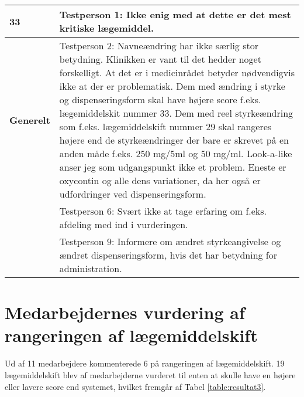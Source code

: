 \begin{longtable} {|p{2.2cm}|p{12cm}|}
\cellcolor[HTML]{C0C0C0}\textbf{33} & Testperson 1: Ikke enig med at dette er det mest kritiske lægemiddel. \\ \hline
\cellcolor[HTML]{C0C0C0}\textbf{Generelt}\multirow{3}{*} & Testperson 2: Navneændring har ikke særlig stor betydning. Klinikken er vant til det hedder noget forskelligt. At det er i medicinrådet betyder nødvendigvis ikke at der er problematisk. Dem med ændring i styrke og dispenseringsform skal have højere score f.eks. lægemiddelskit nummer 33.  Dem med reel styrkeændring som f.eks. lægemiddelskift nummer 29 skal rangeres højere end de styrkeændringer der bare er skrevet på en anden måde f.eks. 250 mg/5ml og 50 mg/ml. Look-a-like anser jeg som udgangspunkt ikke et problem. Eneste er oxycontin og alle dens variationer, da her også er udfordringer ved dispenseringsform.  \\ \cline{2-2}
\cellcolor[HTML]{C0C0C0}    & Testperson 6: Svært ikke at tage erfaring om f.eks. afdeling med ind i vurderingen. \\ \cline{2-2}
\cellcolor[HTML]{C0C0C0}                & Testperson 9: Informere om ændret styrkeangivelse og ændret dispenseringsform, hvis det har betydning for administration. \\ \hline
	\end{longtable}

\newpage
\section{Medarbejdernes vurdering af rangeringen af lægemiddelskift} \label{App:Rang}
Ud af 11 medarbejdere kommenterede 6 på rangeringen af lægemiddelskift. 19 lægemiddelskift blev af medarbejderne vurderet til enten at skulle have en højere eller lavere score end systemet, hvilket fremgår af Tabel \ref{table:resultat3}.

